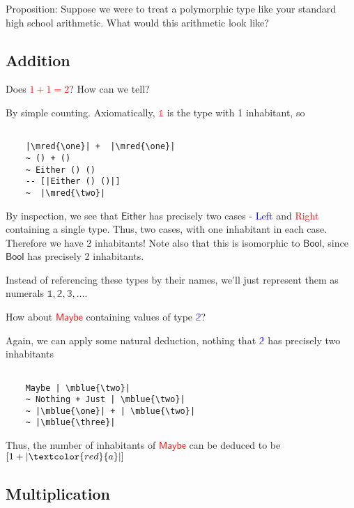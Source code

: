\documentclass[tikz]{beamer}
\newcommand{\cat}[1]{\bm{ \mathsf{#1} }}
\newcommand{\one}{\bm{\mathbb{1}}}
\newcommand{\two}{\bm{\mathbb{2}}}
\newcommand{\three}{\bm{\mathbb{3}}}
\newcommand{\red}[1]{\textcolor{red}{#1}}
\newcommand{\mred}[1]{\textcolor{red}{$#1$}}
\newcommand{\blue}[1]{\textcolor{blue}{#1}}
\newcommand{\mblue}[1]{\textcolor{blue}{$#1$}}
\theoremstyle{definition}
\begin{document}
\frame
{ 
	Proposition: Suppose we were to treat a polymorphic type like your standard high school arithmetic. What would this arithmetic look like? 
}

\subsection{Addition}

\frame
{ 
	Does \mred{1 + 1 = 2}? How can we tell? 
}

\begin{frame}[fragile]
	By simple counting. Axiomatically, \mred{\one} is the type with 1 inhabitant, so
	\begin{verbatim}
	
	|\mred{\one}| +  |\mred{\one}|
	~ () + ()
	~ Either () ()
	-- [|Either () ()|]
	~  |\mred{\two}|
	\end{verbatim}
	
\end{frame}

\frame
{ 
	By inspection, we see that $\cat{Either}$ has precisely two cases - \blue{Left} and \red{Right} containing a single type. Thus, two cases, with one inhabitant in each case. Therefore we have 2 inhabitants! Note also that this is isomorphic to $\cat{Bool}$, since $\cat{Bool}$ has precisely 2 inhabitants. 
}

\frame
{
	Instead of referencing these types by their names, we'll just represent them as numerals $\one, \two, \three, \ldots$. 
}

\frame
{ 
	How about \mred{\cat{Maybe}} containing values of type \mblue{\two}? 
}

\begin{frame}[fragile]

Again, we can apply some natural deduction, nothing that  \mblue{\two} has precisely two inhabitants
	\begin{verbatim}
	
	Maybe | \mblue{\two}|
	~ Nothing + Just | \mblue{\two}|
	~ |\mblue{\one}| + | \mblue{\two}|
	~ |\mblue{\three}| 
	\end{verbatim}
\end{frame}

\frame
{
	Thus, the number of inhabitants of \mred{\cat{Maybe}} can be deduced to be $[1 + |\red{a}|]$
}

\subsection{Multiplication}
\end{document}
